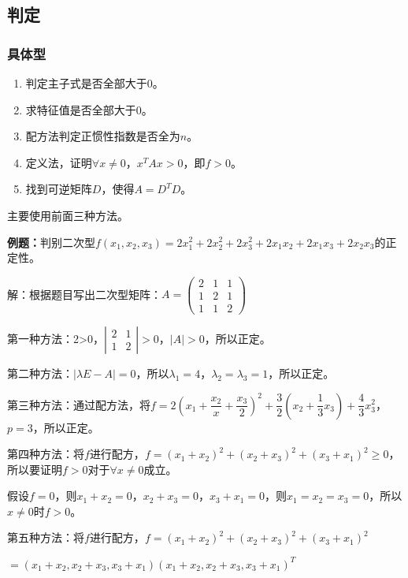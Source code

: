 \documentclass[UTF8, 12pt]{ctexart}
\begin{document}
\subsection{判定}

\subsubsection{具体型}

\begin{enumerate}
    \item 判定主子式是否全部大于0。
    \item 求特征值是否全部大于0。
    \item 配方法判定正惯性指数是否全为$n$。
    \item 定义法，证明$\forall x\neq0$，$x^TAx>0$，即$f>0$。
    \item 找到可逆矩阵$D$，使得$A=D^TD$。
\end{enumerate}

主要使用前面三种方法。

\textbf{例题：}判别二次型$f(x_1,x_2,x_3)=2x_1^2+2x_2^2+2x_3^2+2x_1x_2+2x_1x_3+2x_2x_3$的正定性。

解：根据题目写出二次型矩阵：$A=\left(\begin{array}{ccc}
    2 & 1 & 1 \\
    1 & 2 & 1 \\
    1 & 1 & 2
\end{array}\right)$

第一种方法：2>0，$\left|\begin{array}{cc}
    2 & 1 \\
    1 & 2
\end{array}\right|>0$，$\vert A\vert>0$，所以正定。

第二种方法：$\vert\lambda E-A\vert=0$，所以$\lambda_1=4$，$\lambda_2=\lambda_3=1$，所以正定。

第三种方法：通过配方法，将$f=2\left(x_1+\dfrac{x_2}{x}+\dfrac{x_3}{2}\right)^2+\dfrac{3}{2}\left(x_2+\dfrac{1}{3}x_3\right)+\dfrac{4}{3}x_3^2$，$p=3$，所以正定。

第四种方法：将$f$进行配方，$f=(x_1+x_2)^2+(x_2+x_3)^2+(x_3+x_1)^2\geqslant0$，所以要证明$f>0$对于$\forall x\neq0$成立。

假设$f=0$，则$x_1+x_2=0$，$x_2+x_3=0$，$x_3+x_1=0$，则$x_1=x_2=x_3=0$，所以$x\neq0$时$f>0$。

第五种方法：将$f$进行配方，$f=(x_1+x_2)^2+(x_2+x_3)^2+(x_3+x_1)^2$

$=(x_1+x_2,x_2+x_3,x_3+x_1)(x_1+x_2,x_2+x_3,x_3+x_1)^T$
\end{document}

